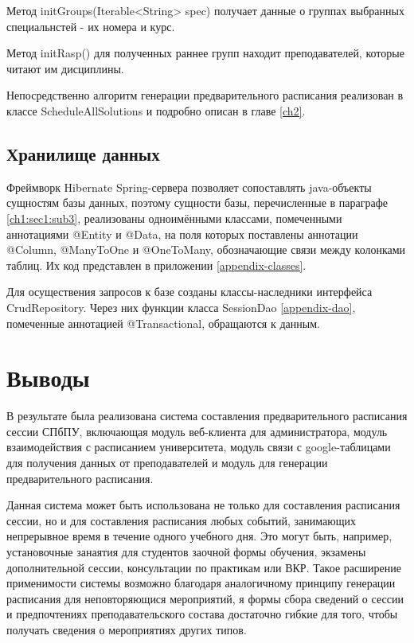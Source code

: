 Метод initGroups(Iterable<String> spec) получает данные о группах выбранных специальнстей - их номера и курс.

Метод initRasp() для полученных раннее групп находит преподавателей, которые читают им дисциплины.

Непосредственно алгоритм генерации предварительного расписания реализован в классе ScheduleAllSolutions и подробно описан в главе \ref{ch2}.

\subsection{Хранилище данных}
Фреймворк Hibernate Spring-сервера позволяет сопоставлять java-объекты сущностям базы данных, поэтому сущности базы, перечисленные в параграфе \ref{ch1:sec1:sub3}, реализованы одноимёнными классами, помеченными аннотациями @Entity и @Data, на поля которых поставлены аннотации @Column, @ManyToOne и @OneToMany, обозначающие связи между колонками таблиц. Их код представлен в приложении \ref{appendix-classes}.

Для осуществения запросов к базе созданы классы-наследники интерфейса CrudRepository. Через них функции класса SessionDao \ref{appendix-dao}, помеченные аннотацией @Transactional, обращаются к данным.

\section{Выводы}

В результате была реализована система составления предварительного расписания сессии СПбПУ, включающая модуль веб-клиента для администратора, модуль взаимодействия с расписанием университета, модуль связи с google-таблицами для получения данных от преподавателей и модуль для генерации предварительного расписания.

Данная система может быть использована не только для составления расписания сессии, но и для  составления расписания любых событий, занимающих непрерывное время в течение одного учебного дня. Это могут быть, например, установочные занаятия для студентов заочной формы обучения, экзамены дополнительной сессии, консультации по практикам или ВКР. Такое расширение применимости системы возможно благодаря аналогичному принципу генерации расписания для неповторяющися мероприятий, я формы сбора сведений о сессии и предпочтениях преподавательского состава достаточно гибкие для того, чтобы получать сведения о мероприятиях других типов.
